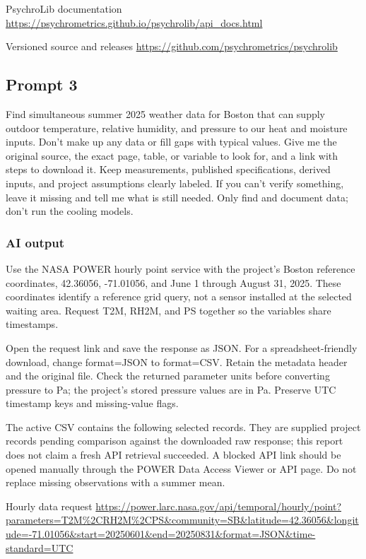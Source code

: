 PsychroLib documentation  \url{https://psychrometrics.github.io/psychrolib/api_docs.html}

Versioned source and releases  \url{https://github.com/psychrometrics/psychrolib}

\subsection*{Prompt 3}
Find simultaneous summer 2025 weather data for Boston that can supply outdoor temperature, relative humidity, and pressure to our heat and moisture inputs. Don’t make up any data or fill gaps with typical values. Give me the original source, the exact page, table, or variable to look for, and a link with steps to download it. Keep measurements, published specifications, derived inputs, and project assumptions clearly labeled. If you can’t verify something, leave it missing and tell me what is still needed. Only find and document data; don’t run the cooling models.

\subsubsection*{AI output}
Use the NASA POWER hourly point service with the project’s Boston reference coordinates, 42.36056, -71.01056, and June 1 through August 31, 2025. These coordinates identify a reference grid query, not a sensor installed at the selected waiting area. Request T2M, RH2M, and PS together so the variables share timestamps.

Open the request link and save the response as JSON. For a spreadsheet-friendly download, change format=JSON to format=CSV. Retain the metadata header and the original file. Check the returned parameter units before converting pressure to Pa; the project’s stored pressure values are in Pa. Preserve UTC timestamp keys and missing-value flags.

The active CSV contains the following selected records. They are supplied project records pending comparison against the downloaded raw response; this report does not claim a fresh API retrieval succeeded. A blocked API link should be opened manually through the POWER Data Access Viewer or API page. Do not replace missing observations with a summer mean.

Hourly data request  \url{https://power.larc.nasa.gov/api/temporal/hourly/point?parameters=T2M%2CRH2M%2CPS&community=SB&latitude=42.36056&longitude=-71.01056&start=20250601&end=20250831&format=JSON&time-standard=UTC}

